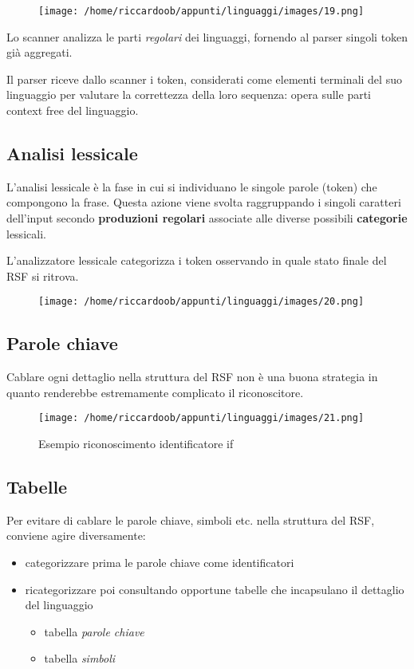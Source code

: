 \begin{figure}[H]
    \centering
    \texttt{[image: /home/riccardoob/appunti/linguaggi/images/19.png]}
\end{figure}

Lo scanner analizza le parti \textit{regolari} dei linguaggi, fornendo al parser singoli token già aggregati.

Il parser riceve dallo scanner i token, considerati come elementi terminali del suo linguaggio per valutare la correttezza della loro sequenza: opera sulle parti context free del linguaggio.

\subsection{Analisi lessicale}
L'analisi lessicale è la fase in cui si individuano le singole parole (token) che compongono la frase. Questa azione viene svolta raggruppando i singoli caratteri dell'input secondo \textbf{produzioni regolari} associate alle diverse possibili \textbf{categorie} lessicali.

L'analizzatore lessicale categorizza i token osservando in quale stato finale del RSF si ritrova.

\begin{figure}[H]
    \centering
    \texttt{[image: /home/riccardoob/appunti/linguaggi/images/20.png]}
\end{figure}

\subsection{Parole chiave}
Cablare ogni dettaglio nella struttura del RSF non è una buona strategia in quanto renderebbe estremamente complicato il riconoscitore.

\begin{figure}[H]
    \caption{Esempio riconoscimento identificatore if}
    \centering
    \texttt{[image: /home/riccardoob/appunti/linguaggi/images/21.png]}
\end{figure}

\subsection{Tabelle}
Per evitare di cablare le parole chiave, simboli etc. nella struttura del RSF, conviene agire diversamente:
\begin{itemize}
    \item categorizzare prima le parole chiave come identificatori
    \item ricategorizzare poi consultando opportune tabelle che incapsulano il dettaglio del linguaggio
    \begin{itemize}
        \item tabella \textit{parole chiave}
        \item tabella \textit{simboli}
    \end{itemize}
\end{itemize}

